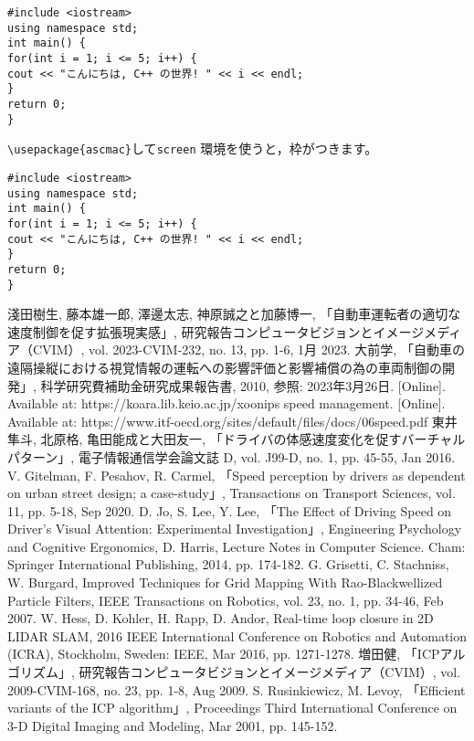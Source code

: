\documentclass[a4paper,12pt]{jreport}
\begin{document}
\begin{verbatim}
#include <iostream>
using namespace std;
int main() {
for(int i = 1; i <= 5; i++) {
cout << "こんにちは, C++ の世界! " << i << endl;
}
return 0;
}
\end{verbatim}
\verb|\usepackage{ascmac}|して\verb|screen| 環境を使うと，枠がつきます。
\begin{screen}
\begin{verbatim}
#include <iostream>
using namespace std;
int main() {
for(int i = 1; i <= 5; i++) {
cout << "こんにちは, C++ の世界! " << i << endl;
}
return 0;
}
\end{verbatim}
\end{screen}

\begin{thebibliography}{99}
   淺田樹生, 藤本雄一郎, 澤邊太志, 神原誠之と加藤博一, 「自動車運転者の適切な速度制御を促す拡張現実感」, 研究報告コンピュータビジョンとイメージメディア（CVIM）, vol. 2023-CVIM-232, no. 13, pp. 1-6, 1月 2023.
   大前学, 「自動車の遠隔操縦における視覚情報の運転への影響評価と影響補償の為の車両制御の開発」, 科学研究費補助金研究成果報告書, 2010, 参照: 2023年3月26日. [Online]. Available at: https://koara.lib.keio.ac.jp/xoonips
   speed management. [Online]. Available at: https://www.itf-oecd.org/sites/default/files/docs/06speed.pdf
   東井隼斗, 北原格, 亀田能成と大田友一, 「ドライバの体感速度変化を促すバーチャルパターン」, 電子情報通信学会論文誌 D, vol. J99-D, no. 1, pp. 45-55, Jan 2016.
   V. Gitelman, F. Pesahov, R. Carmel, 「Speed perception by drivers as dependent on urban street design; a case-study」, Transactions on Transport Sciences, vol. 11, pp. 5-18, Sep 2020.
  D. Jo, S. Lee, Y. Lee, 「The Effect of Driving Speed on Driver's Visual Attention: Experimental Investigation」, Engineering Psychology and Cognitive Ergonomics, D. Harris, Lecture Notes in Computer Science. Cham: Springer International Publishing, 2014, pp. 174-182.
  G. Grisetti, C. Stachniss, W. Burgard,  Improved Techniques for Grid Mapping With Rao-Blackwellized Particle Filters, IEEE Transactions on Robotics, vol. 23, no. 1, pp. 34-46, Feb 2007.
  W. Hess, D. Kohler, H. Rapp, D. Andor, Real-time loop closure in 2D LIDAR SLAM, 2016 IEEE International Conference on Robotics and Automation (ICRA), Stockholm, Sweden: IEEE, Mar 2016, pp. 1271-1278.
  増田健, 「ICPアルゴリズム」, 研究報告コンピュータビジョンとイメージメディア（CVIM）, vol. 2009-CVIM-168, no. 23, pp. 1-8, Aug 2009.
  S. Rusinkiewicz, M. Levoy, 「Efficient variants of the ICP algorithm」, Proceedings Third International Conference on 3-D Digital Imaging and Modeling, Mar 2001, pp. 145-152.
\end{thebibliography}
  
\end{document}
